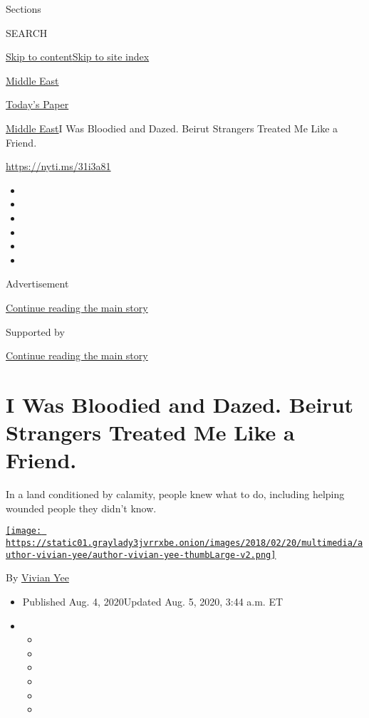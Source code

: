 Sections

SEARCH

\protect\hyperlink{site-content}{Skip to
content}\protect\hyperlink{site-index}{Skip to site index}

\href{https://www.nytimes3xbfgragh.onion/section/world/middleeast}{Middle
East}

\href{https://myaccount.nytimes3xbfgragh.onion/auth/login?response_type=cookie\&client_id=vi}{}

\href{https://www.nytimes3xbfgragh.onion/section/todayspaper}{Today's
Paper}

\href{/section/world/middleeast}{Middle East}\textbar{}I Was Bloodied
and Dazed. Beirut Strangers Treated Me Like a Friend.

\url{https://nyti.ms/31i3a81}

\begin{itemize}
\item
\item
\item
\item
\item
\item
\end{itemize}

Advertisement

\protect\hyperlink{after-top}{Continue reading the main story}

Supported by

\protect\hyperlink{after-sponsor}{Continue reading the main story}

\hypertarget{i-was-bloodied-and-dazed-beirut-strangers-treated-me-like-a-friend}{%
\section{I Was Bloodied and Dazed. Beirut Strangers Treated Me Like a
Friend.}\label{i-was-bloodied-and-dazed-beirut-strangers-treated-me-like-a-friend}}

In a land conditioned by calamity, people knew what to do, including
helping wounded people they didn't know.

\href{https://www.nytimes3xbfgragh.onion/by/vivian-yee}{\texttt{[image: https://static01.graylady3jvrrxbe.onion/images/2018/02/20/multimedia/author-vivian-yee/author-vivian-yee-thumbLarge-v2.png]}}

By \href{https://www.nytimes3xbfgragh.onion/by/vivian-yee}{Vivian Yee}

\begin{itemize}
\item
  Published Aug. 4, 2020Updated Aug. 5, 2020, 3:44 a.m. ET
\item
  \begin{itemize}
  \item
  \item
  \item
  \item
  \item
  \item
  \end{itemize}
\end{itemize}

